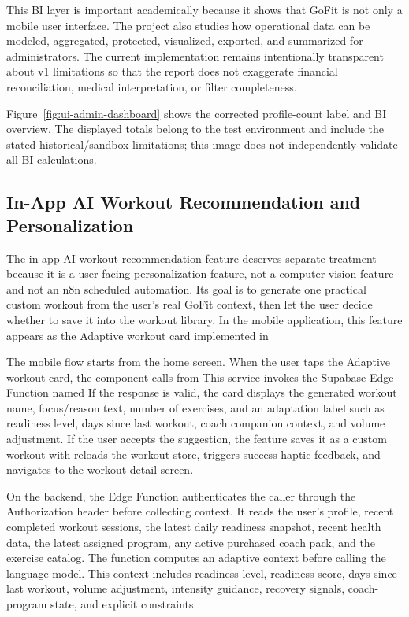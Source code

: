 \documentclass[12pt,a4paper,openany]{report}
\begin{document}
This BI layer is important academically because it shows that GoFit is not only a mobile user interface. The project also studies how operational data can be modeled, aggregated, protected, visualized, exported, and summarized for administrators. The current implementation remains intentionally transparent about v1 limitations so that the report does not exaggerate financial reconciliation, medical interpretation, or filter completeness.


Figure~\ref{fig:ui-admin-dashboard} shows the corrected profile-count label and BI overview. The displayed totals belong to the test environment and include the stated historical/sandbox limitations; this image does not independently validate all BI calculations.



\subsection{In-App AI Workout Recommendation and Personalization}

The in-app AI workout recommendation feature deserves separate treatment because it is a user-facing personalization feature, not a computer-vision feature and not an n8n scheduled automation. Its goal is to generate one practical custom workout from the user's real GoFit context, then let the user decide whether to save it into the workout library. In the mobile application, this feature appears as the Adaptive workout card implemented in 


The mobile flow starts from the home screen. When the user taps the Adaptive workout card, the component calls  from  This service invokes the Supabase Edge Function named  If the response is valid, the card displays the generated workout name, focus/reason text, number of exercises, and an adaptation label such as readiness level, days since last workout, coach companion context, and volume adjustment. If the user accepts the suggestion, the feature saves it as a custom workout with  reloads the workout store, triggers success haptic feedback, and navigates to the workout detail screen.


On the backend, the  Edge Function authenticates the caller through the Authorization header before collecting context. It reads the user's profile, recent completed workout sessions, the latest daily readiness snapshot, recent health data, the latest assigned program, any active purchased coach pack, and the exercise catalog. The function computes an adaptive context before calling the language model. This context includes readiness level, readiness score, days since last workout, volume adjustment, intensity guidance, recovery signals, coach-program state, and explicit constraints.
\end{document}
